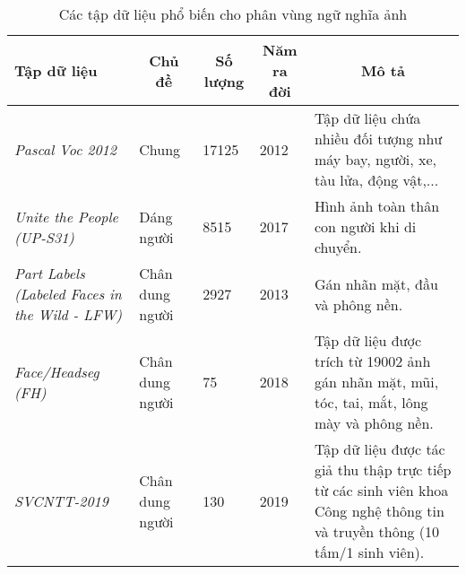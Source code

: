 \documentclass[../the.tex]{subfiles}
\begin{document}
\begin{table}[!h]
	\centering
	\begin{tabular}{|p{3cm}|p{2cm}|p{2cm}|p{2cm}|p{4cm}|}
		\hline
		\multicolumn{1}{|l|}{
			\textbf{Tập dữ liệu}} 
		& \multicolumn{1}{c|}{\textbf{Chủ đề}} 
		& \multicolumn{1}{c|}{\textbf{Số lượng}}
		& \multicolumn{1}{c|}{\textbf{Năm ra đời}} 
		& \multicolumn{1}{c|}{\textbf{Mô tả}} \\ 
		\hline
		
		\textit{Pascal Voc 2012} 
		& Chung 
		& 17125 
		& 2012 
		& Tập dữ liệu chứa nhiều đối tượng như máy bay, người, xe, tàu lửa, động vật,... \\
		\hline
		
		\textit{Unite the People (UP-S31)} 
		& Dáng người 
		& 8515 
		& 2017 
		& Hình ảnh toàn thân con người khi di chuyển. \\
		\hline
		
		\textit{Part Labels (Labeled Faces in the Wild - LFW)} 
		& Chân dung người 
		& 2927 
		& 2013 
		& Gán nhãn mặt, đầu và phông nền. \\
		\hline
		
		\textit{Face/Headseg (FH)} 
		& Chân dung người 
		& 75 
		& 2018 
		& Tập dữ liệu được trích từ 19002 ảnh gán nhãn mặt, mũi, tóc, tai, mắt, lông mày và phông nền. \\
		\hline
		
		\textit{SVCNTT-2019} 
		& Chân dung người 
		& 130 
		& 2019 
		& Tập dữ liệu được tác giả thu thập trực tiếp từ các sinh viên khoa Công nghệ thông tin và truyền thông (10 tấm/1 sinh viên). \\
		\hline
	\end{tabular}
	
	\caption{Các tập dữ liệu phổ biến cho phân vùng ngữ nghĩa ảnh}
	\label{segman_seg_dataset}
\end{table}
\end{document}

